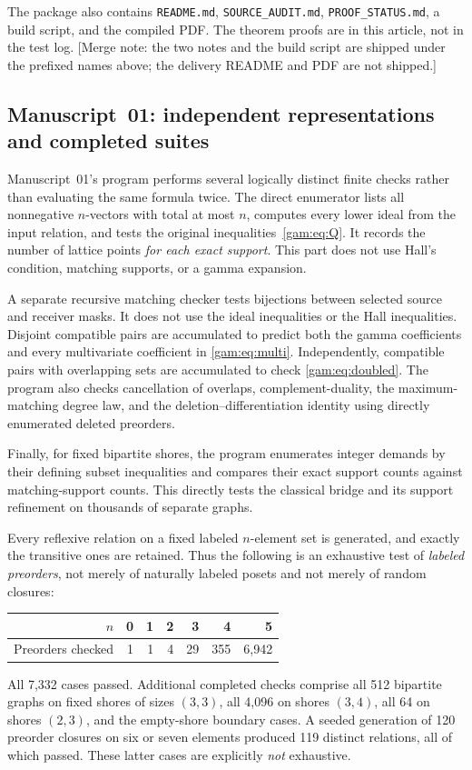 \documentclass[11pt]{article}
\numberwithin{equation}{section}
\theoremstyle{definition}
\begin{document}
The package also contains \texttt{README.md}, \texttt{SOURCE\_AUDIT.md},
\texttt{PROOF\_STATUS.md}, a build script, and the compiled PDF. The theorem
proofs are in this article, not in the test log. [Merge note: the two notes
and the build script are shipped under the prefixed names above; the
delivery README and PDF are not shipped.]

\subsection{Manuscript~01: independent representations and completed suites}
Manuscript~01's program performs several logically distinct finite checks
rather than evaluating the same formula twice. The direct enumerator lists
all nonnegative $n$-vectors with total at most $n$, computes every lower
ideal from the input relation, and tests the original
inequalities~\eqref{gam:eq:Q}. It records the number of lattice points
\emph{for each exact support}. This part does not use Hall's condition,
matching supports, or a gamma expansion.

A separate recursive matching checker tests bijections between selected
source and receiver masks. It does not use the ideal inequalities or the
Hall inequalities. Disjoint compatible pairs are accumulated to predict
both the gamma coefficients and every multivariate coefficient in
\eqref{gam:eq:multi}. Independently, compatible pairs with overlapping sets
are accumulated to check \eqref{gam:eq:doubled}. The program also checks
cancellation of overlaps, complement-duality, the maximum-matching degree
law, and the deletion--differentiation identity using directly enumerated
deleted preorders.

Finally, for fixed bipartite shores, the program enumerates integer demands
by their defining subset inequalities and compares their exact support
counts against matching-support counts. This directly tests the classical
bridge and its support refinement on thousands of separate graphs.

Every reflexive relation on a fixed labeled $n$-element set is generated,
and exactly the transitive ones are retained. Thus the following is an
exhaustive test of \emph{labeled preorders}, not merely of naturally labeled
posets and not merely of random closures:
\begin{center}
\begin{tabular}{@{}rrrrrrr@{}}
\toprule
$n$ & 0 & 1 & 2 & 3 & 4 & 5\\
\midrule
Preorders checked & 1 & 1 & 4 & 29 & 355 & 6,942\\
\bottomrule
\end{tabular}
\end{center}
All 7,332 cases passed. Additional completed checks comprise all 512
bipartite graphs on fixed shores of sizes $(3,3)$, all 4,096 on shores
$(3,4)$, all 64 on shores $(2,3)$, and the empty-shore boundary cases.
A seeded generation of 120 preorder closures on six or seven elements
produced 119 distinct relations, all of which passed. These latter cases
are explicitly \emph{not} exhaustive.
\end{document}
